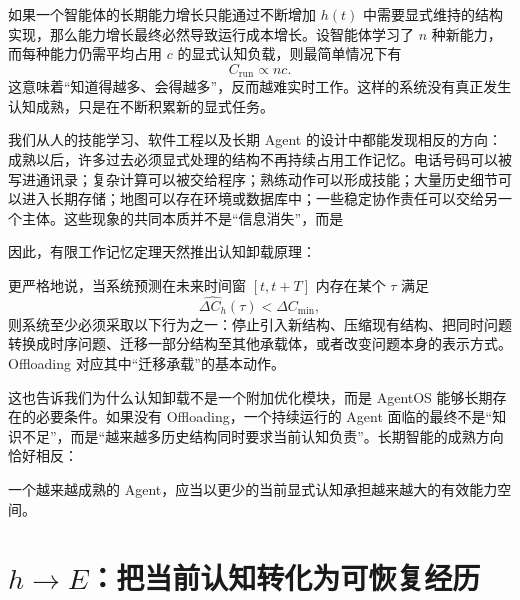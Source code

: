 如果一个智能体的长期能力增长只能通过不断增加 $h(t)$ 中需要显式维持的结构实现，那么能力增长最终必然导致运行成本增长。设智能体学习了 $n$ 种新能力，而每种能力仍需平均占用 $c$ 的显式认知负载，则最简单情况下有
\begin{equation}
C_{\mathrm{run}}
\propto
nc.
\end{equation}
这意味着“知道得越多、会得越多”，反而越难实时工作。这样的系统没有真正发生认知成熟，只是在不断积累新的显式任务。

我们从人的技能学习、软件工程以及长期 Agent 的设计中都能发现相反的方向：成熟以后，许多过去必须显式处理的结构不再持续占用工作记忆。电话号码可以被写进通讯录；复杂计算可以被交给程序；熟练动作可以形成技能；大量历史细节可以进入长期存储；地图可以存在环境或数据库中；一些稳定协作责任可以交给另一个主体。这些现象的共同本质并不是“信息消失”，而是
\begin{statementbox}
\centering
{}
\end{statementbox}

因此，有限工作记忆定理天然推出认知卸载原理：
\begin{statementbox}
\centering
{}
\end{statementbox}

更严格地说，当系统预测在未来时间窗 $[t,t+T]$ 内存在某个 $\tau$ 满足
\begin{equation}
\widehat{\Delta C_h}(\tau)<\Delta C_{\min},
\end{equation}
则系统至少必须采取以下行为之一：停止引入新结构、压缩现有结构、把同时问题转换成时序问题、迁移一部分结构至其他承载体，或者改变问题本身的表示方式。Offloading 对应其中“迁移承载”的基本动作。

这也告诉我们为什么认知卸载不是一个附加优化模块，而是 AgentOS 能够长期存在的必要条件。如果没有 Offloading，一个持续运行的 Agent 面临的最终不是“知识不足”，而是“越来越多历史结构同时要求当前认知负责”。长期智能的成熟方向恰好相反：
\begin{statementbox}
\centering
{}
\end{statementbox}
一个越来越成熟的 Agent，应当以更少的当前显式认知承担越来越大的有效能力空间。

\section{$h\rightarrow E$：把当前认知转化为可恢复经历}


